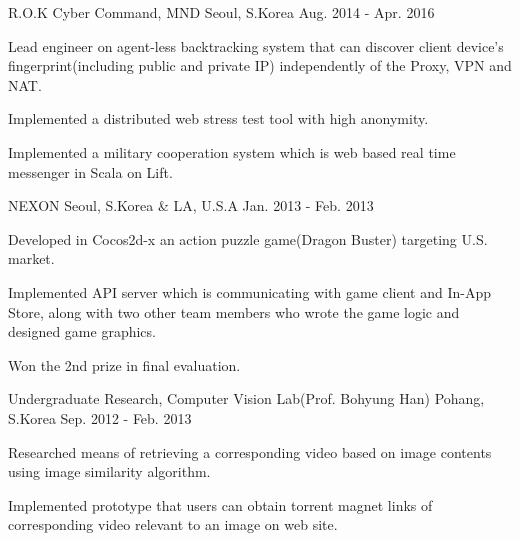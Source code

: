 \begin{cventries}
	{R.O.K Cyber Command, MND} %
	{Seoul, S.Korea} %
	{Aug. 2014 - Apr. 2016} %
	{
		\begin{cvitems} %
			\item {Lead engineer on agent-less backtracking system that can discover client device's fingerprint(including public and private IP) independently of the Proxy, VPN and NAT.}
			\item {Implemented a distributed web stress test tool with high anonymity.}
			\item {Implemented a military cooperation system which is web based real time messenger in Scala on Lift.}
		\end{cvitems}
	}

	{NEXON} %
	{Seoul, S.Korea \& LA, U.S.A} %
	{Jan. 2013 - Feb. 2013} %
	{
		\begin{cvitems} %
			\item {Developed in Cocos2d-x an action puzzle game(Dragon Buster) targeting U.S. market.}
			\item {Implemented API server which is communicating with game client and In-App Store, along with two other team members who wrote the game logic and designed game graphics.}
			\item {Won the 2nd prize in final evaluation.}
		\end{cvitems}
	}

	{Undergraduate Research, Computer Vision Lab(Prof. Bohyung Han)} %
	{Pohang, S.Korea} %
	{Sep. 2012 - Feb. 2013} %
	{
		\begin{cvitems} %
			\item {Researched means of retrieving a corresponding video based on image contents using image similarity algorithm.}
			\item {Implemented prototype that users can obtain torrent magnet links of corresponding video relevant to an image on web site.}
		\end{cvitems}
	}


\end{cventries}
